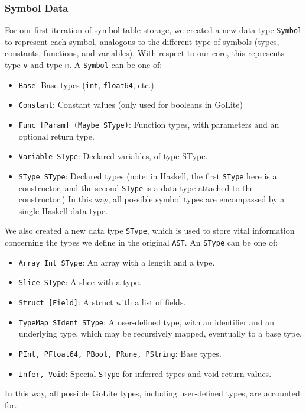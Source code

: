 \documentclass[11pt]{article}
\begin{document}
\subsubsection{Symbol Data}
For our first iteration of symbol table storage, we created a new data type \texttt{Symbol}
to represent each symbol, analogous to the different type of symbols
(types, constants, functions, and variables).
With respect to our core, this represents type \texttt{v} and type \texttt{m}.
A \texttt{Symbol} can be
one of:
\begin{itemize}
\item \texttt{Base}: Base types (\texttt{int}, \texttt{float64}, etc.)
\item \texttt{Constant}: Constant values (only used for booleans in
  GoLite)
\item \texttt{Func [Param] (Maybe SType)}: Function types, with
  parameters and an optional return type.
\item \texttt{Variable SType}: Declared variables, of type SType.
\item \texttt{SType SType}: Declared types (note: in Haskell, the
  first \texttt{SType} here is a constructor, and the second
  \texttt{SType} is a data type attached to the constructor.)  In this
  way, all possible symbol types are encompassed by a single Haskell
  data type.
\end{itemize}

We also created a new data type \texttt{SType}, which is used to store
vital information concerning the types we define in the original
\texttt{AST}.  An \texttt{SType} can be one of:
\begin{itemize}
\item \texttt{Array Int SType}: An array with a length and a type.
\item \texttt{Slice SType}: A slice with a type.
\item \texttt{Struct [Field]}: A struct with a list of fields.
\item \texttt{TypeMap SIdent SType}: A user-defined type, with an
  identifier and an underlying type, which may be recursively mapped,
  eventually to a base type.
\item \texttt{PInt, PFloat64, PBool, PRune, PString}: Base types.
\item \texttt{Infer, Void}: Special
  \texttt{SType} for inferred types and void
  return values.
\end{itemize}
In this way, all possible GoLite types, including user-defined types,
are accounted for.
\end{document}
